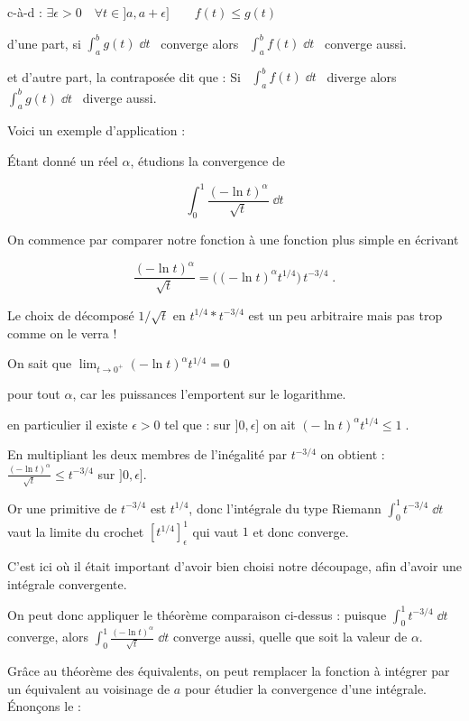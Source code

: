 c-à-d : $\exists \epsilon>0 \quad \forall t\in ]a,a+\epsilon] \qquad f(t)\le g(t)$

d'une part, si $\int_a^b g(t)\;\dd t$ \  converge 
alors \  $\int_a^b f(t)\;\dd t$ \  converge aussi. 

et d'autre part, la contraposée dit que :
Si \  $\int_a^{b} f(t)\;\dd t$ \  diverge 
alors \  $\int_a^{b} g(t)\;\dd t$ \  diverge aussi.



\change
Voici un exemple d'application :

Étant donné un réel $\alpha$, étudions la convergence de 

$$\int_0^1 \frac{(-\ln t)^\alpha}{\sqrt{t}}\;\dd t$$

\change
On commence par comparer notre fonction à une fonction plus 
simple en écrivant 

$$\frac{(-\ln t)^\alpha}{\sqrt{t}} 
= \big((-\ln t)^\alpha t^{1/4}\big)\,t^{-3/4}\;. $$

Le choix de décomposé $1/\sqrt{t}$  en $t^{1/4}*t^{-3/4}$
est un peu arbitraire mais pas trop comme on le verra !

\change
On sait que $\lim_{t\rightarrow 0^+}  (-\ln t)^\alpha t^{1/4}=0$

 pour tout $\alpha$, car les puissances 
 l'emportent sur le logarithme.
 

 \change 
 en particulier il existe $\epsilon>0$ tel que :
sur $]0,\epsilon]$ on ait $(-\ln t)^\alpha t^{1/4}\le 1\;.$ 

 \change 
En multipliant les deux membres de l'inégalité 
par $t^{-3/4}$ on obtient :
$\frac{(-\ln t)^\alpha}{\sqrt{t}} \le t^{-3/4}$
sur $]0,\epsilon]$.


\change
Or une primitive de $t^{-3/4}$ est $t^{1/4}$, donc
l'intégrale du type Riemann $\int_0^1 t^{-3/4}\;\dd t$ 
vaut la limite du crochet $[t^{1/4}]_\epsilon^1$ 
qui vaut $1$ et donc converge.

C'est ici où il était important d'avoir bien 
choisi notre découpage, afin d'avoir
une intégrale convergente.

\change
On peut donc appliquer le théorème comparaison ci-dessus : 
puisque $\int_0^1 t^{-3/4}\;\dd t$ converge, 
alors $\int_0^1 \frac{(-\ln t)^\alpha}{\sqrt{t}}\;\dd t$ 
converge aussi, quelle que soit la valeur de $\alpha$.  

\diapo

Gr\^ace au théorème des équivalents, 
on peut remplacer la fonction à intégrer 
par un équivalent au voisinage de $a$ pour
étudier la convergence d'une intégrale. Énonçons le :

